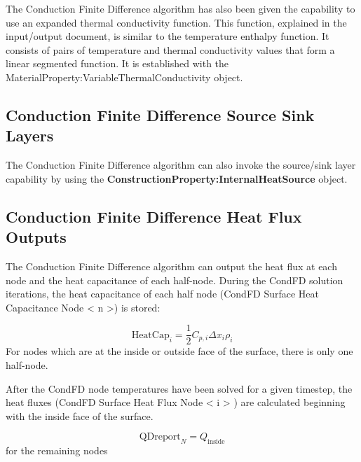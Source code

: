 The Conduction Finite Difference algorithm has also been given the capability to
use an expanded thermal conductivity function. This function, explained in the
input/output document, is similar to the temperature enthalpy function. It
consists of pairs of temperature and thermal conductivity values that form a
linear segmented function. It is established with the
MaterialProperty:VariableThermalConductivity object.

\subsection{Conduction Finite Difference Source Sink Layers}%
\label{conduction-finite-difference-source-sink-layers}

The Conduction Finite Difference algorithm can also invoke the source/sink layer
capability by using the \textbf{ConstructionProperty:InternalHeatSource} object.

\subsection{Conduction Finite Difference Heat Flux Outputs}%
\label{conduction-finite-difference-heat-flux-outputs}

The Conduction Finite Difference algorithm can output the heat flux at each node
and the heat capacitance of each half-node. During the CondFD solution
iterations, the heat capacitance of each half node (CondFD Surface Heat
Capacitance Node \textless{} n \textgreater{}) is stored:

\begin{equation}
\text{HeatCap}_i = \frac{1}{2}C_{p,i}\Delta x_i \rho_i
\end{equation}
%
For nodes which are at the inside or outside face of the surface, there is only
one half-node.

After the CondFD node temperatures have been solved for a given timestep, the
heat fluxes (CondFD Surface Heat Flux Node \textless{} i \textgreater{} ) are
calculated beginning with the inside face of the surface.

\begin{equation}
\text{QDreport}_N = Q_{\text{inside}}
\end{equation}
%
for the remaining nodes

